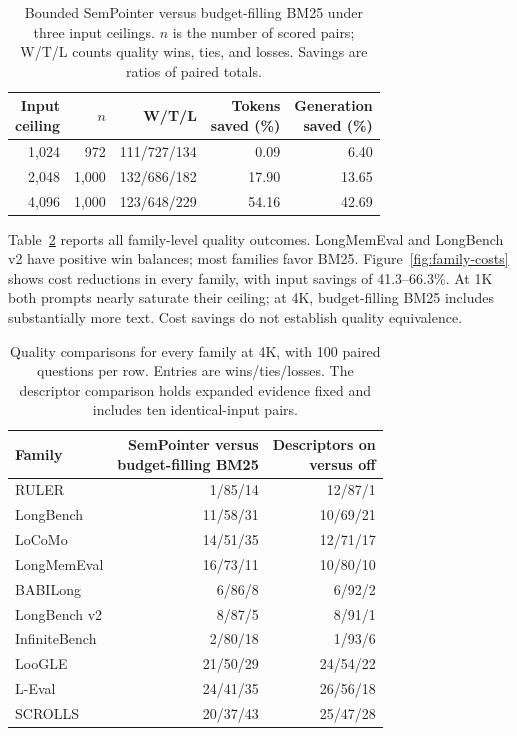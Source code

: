 \documentclass[pdflatex,sn-mathphys-num]{sn-jnl}
\begin{document}
\begingroup
\renewcommand{\tablebodyfont}{\normalsize}
\renewcommand{\tablecaptionfont}{\small}
\begin{table}[!htbp]\centering
\caption{Bounded SemPointer versus budget-filling BM25 under three input ceilings. $n$ is the number of scored pairs; W/T/L counts quality wins, ties, and losses. Savings are ratios of paired totals.}\label{tab:budgets}
\begin{tabular*}{\linewidth}{@{\extracolsep{\fill}}rrrrr@{}}\toprule
\shortstack{Input\\ceiling} & $n$ & W/T/L & \shortstack{Tokens\\saved (\%)} & \shortstack{Generation\\saved (\%)} \\
\midrule
1,024 & 972 & 111/727/134 & 0.09 & 6.40 \\
2,048 & 1,000 & 132/686/182 & 17.90 & 13.65 \\
4,096 & 1,000 & 123/648/229 & 54.16 & 42.69 \\
\bottomrule\end{tabular*}\end{table}
\endgroup

Table~\ref{tab:families} reports all family-level quality outcomes. LongMemEval and LongBench v2 have positive win balances; most families favor BM25. Figure~\ref{fig:family-costs} shows cost reductions in every family, with input savings of 41.3--66.3\%. At 1K both prompts nearly saturate their ceiling; at 4K, budget-filling BM25 includes substantially more text. Cost savings do not establish quality equivalence.



\begingroup
\renewcommand{\tablebodyfont}{\normalsize}
\renewcommand{\tablecaptionfont}{\small}
\begin{table}[!htbp]\centering
\caption{Quality comparisons for every family at 4K, with 100 paired questions per row. Entries are wins/ties/losses. The descriptor comparison holds expanded evidence fixed and includes ten identical-input pairs.}\label{tab:families}
\begin{tabular*}{\linewidth}{@{\extracolsep{\fill}}lrr@{}}\toprule
Family & \shortstack{SemPointer versus\\budget-filling BM25} & \shortstack{Descriptors on\\versus off} \\
\midrule
RULER & 1/85/14 & 12/87/1 \\
LongBench & 11/58/31 & 10/69/21 \\
LoCoMo & 14/51/35 & 12/71/17 \\
LongMemEval & 16/73/11 & 10/80/10 \\
BABILong & 6/86/8 & 6/92/2 \\
LongBench v2 & 8/87/5 & 8/91/1 \\
InfiniteBench & 2/80/18 & 1/93/6 \\
LooGLE & 21/50/29 & 24/54/22 \\
L-Eval & 24/41/35 & 26/56/18 \\
SCROLLS & 20/37/43 & 25/47/28 \\
\bottomrule\end{tabular*}\end{table}
\endgroup
\end{document}
